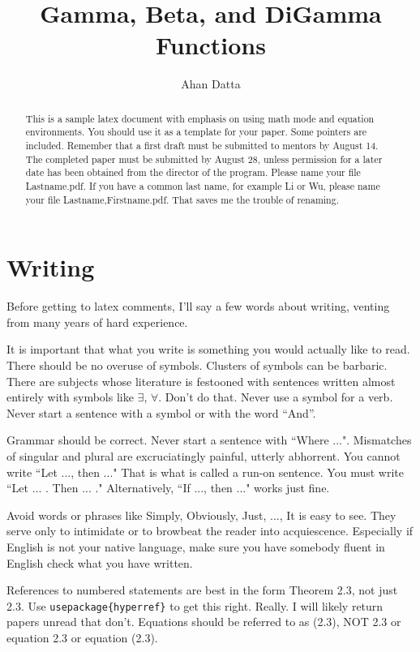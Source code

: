 \documentclass[openany, amssymb, psamsfonts]{amsart}
\title{Gamma, Beta, and DiGamma Functions}
\author{Ahan Datta}
\theoremstyle{definition}
\numberwithin{equation}{section}
\begin{document}
\begin{abstract}

This is a sample latex document with emphasis on using math mode and
equation environments.  You should use it as a template for your paper.
Some pointers are included. 
Remember that a first draft must be submitted to mentors by August 14.  The completed paper must be submitted by August 28, unless  permission for a later date has been obtained from the director of the program.   Please  name your file  Lastname.pdf.  If you have a common last name, for example Li or Wu, please name your file Lastname,Firstname.pdf.  That saves me the trouble of renaming.


\end{abstract}

\maketitle

\tableofcontents

\section{Writing}  Before getting to latex comments, I'll say a few words about writing, venting from many years of hard experience. 

It is important that what you write is something you would actually like to read.  There should be no overuse of symbols.
Clusters of symbols can be barbaric.  There are subjects whose literature is festooned with sentences written almost entirely with symbols like $\exists$, $\forall$.  Don't do that. Never use a symbol for a verb.  Never start a sentence with a symbol or with the word ``And''.

Grammar should be correct.  Never start a sentence with ``Where ...".   
Mismatches of singular and plural are excruciatingly painful, utterly abhorrent.  You cannot write
``Let ..., then ..."  That is what is called a run-on sentence. You must write ``Let ... .  Then ... ."
Alternatively, ``If ..., then ..."  works just fine.

Avoid words or phrases like Simply, Obviously, Just, ..., It is easy to see.  They serve only to intimidate or to browbeat the reader into acquiescence. 
Especially if English is not your native language, make sure you have  somebody fluent in English check what you have written.     

References to numbered statements are best in the form Theorem 2.3, not just 2.3.  Use  \verb|usepackage{hyperref}| to get this right.  Really.  I will likely return papers unread that don't. 
Equations should be referred to as (2.3), NOT 2.3 or equation 2.3 or equation (2.3).
\end{document}

